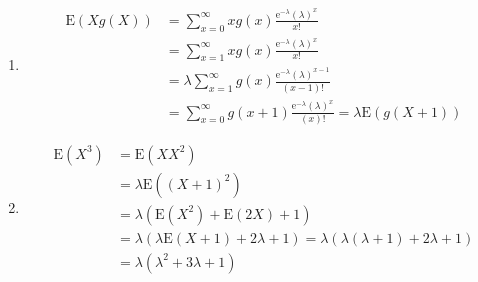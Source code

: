 \begin{enumerate}[label=(\alph*)]
\item 
\begin{align*}
\text{E}(Xg(X)) &= \sum_{x=0}^{\infty}xg(x)\frac{\text{e}^{-\lambda}
(\lambda)^{x}}{x!} \\
&= \sum_{x=1}^{\infty}xg(x)\frac{\text{e}^{-\lambda}
(\lambda)^{x}}{x!} \\
&= \lambda\sum_{x=1}^{\infty}g(x)\frac{\text{e}^{-\lambda}
(\lambda)^{x-1}}{(x-1)!} \\
&= \sum_{x=0}^{\infty}g(x+1)\frac{\text{e}^{-\lambda}
(\lambda)^{x}}{(x)!} = \lambda\text{E}(g(X+1))
\end{align*}

\item 
\begin{align*}
\text{E}(X^{3}) &= \text{E}(XX^{2}) \\
&= \lambda\text{E}((X+1)^{2}) \\
&= \lambda(\text{E}(X^{2}) + \text{E}(2X) + 1) \\
&= \lambda(\lambda\text{E}(X+1) +
2\lambda + 1) = \lambda(\lambda(\lambda + 1) + 2\lambda + 1) \\
&= \lambda(\lambda^{2} + 3\lambda + 1)
\end{align*}
\end{enumerate}
